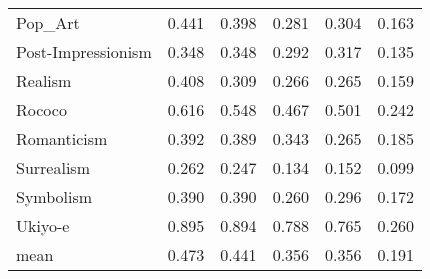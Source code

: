 \begin{tabular}{llllll}
Pop\_Art                      &                 0.441 &  0.398 &   0.281 &              0.304 &    0.163 \\
Post-Impressionism           &                 0.348 &  0.348 &   0.292 &              0.317 &    0.135 \\
Realism                      &                 0.408 &  0.309 &   0.266 &              0.265 &    0.159 \\
Rococo                       &                 0.616 &  0.548 &   0.467 &              0.501 &    0.242 \\
Romanticism                  &                 0.392 &  0.389 &   0.343 &              0.265 &    0.185 \\
Surrealism                   &                 0.262 &  0.247 &   0.134 &              0.152 &    0.099 \\
Symbolism                    &                 0.390 &  0.390 &   0.260 &              0.296 &    0.172 \\
Ukiyo-e                      &                 0.895 &  0.894 &   0.788 &              0.765 &    0.260 \\
\midrule
mean                        &                 0.473 &  0.441 &   0.356 &              0.356 &    0.191 \\
\bottomrule
\end{tabular}
